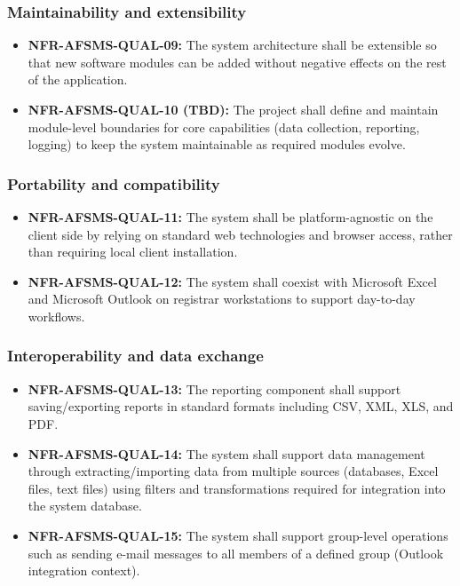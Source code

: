 \documentclass[11pt, a4paper]{article}
\begin{document}
\subsubsection{Maintainability and extensibility}
\begin{itemize}
    \item \textbf{NFR-AFSMS-QUAL-09:} The system architecture shall be extensible so that new software modules can be added without negative effects on the rest of the application.
    \item \textbf{NFR-AFSMS-QUAL-10 (TBD):} The project shall define and maintain module-level boundaries for core capabilities (data collection, reporting, logging) to keep the system maintainable as required modules evolve.
\end{itemize}

\subsubsection{Portability and compatibility}
\begin{itemize}
    \item \textbf{NFR-AFSMS-QUAL-11:} The system shall be platform-agnostic on the client side by relying on standard web technologies and browser access, rather than requiring local client installation.
    \item \textbf{NFR-AFSMS-QUAL-12:} The system shall coexist with Microsoft Excel and Microsoft Outlook on registrar workstations to support day-to-day workflows.
\end{itemize}

\subsubsection{Interoperability and data exchange}
\begin{itemize}
    \item \textbf{NFR-AFSMS-QUAL-13:} The reporting component shall support saving/exporting reports in standard formats including CSV, XML, XLS, and PDF.
    \item \textbf{NFR-AFSMS-QUAL-14:} The system shall support data management through extracting/importing data from multiple sources (databases, Excel files, text files) using filters and transformations required for integration into the system database.
    \item \textbf{NFR-AFSMS-QUAL-15:} The system shall support group-level operations such as sending e-mail messages to all members of a defined group (Outlook integration context).
\end{itemize}
\end{document}
